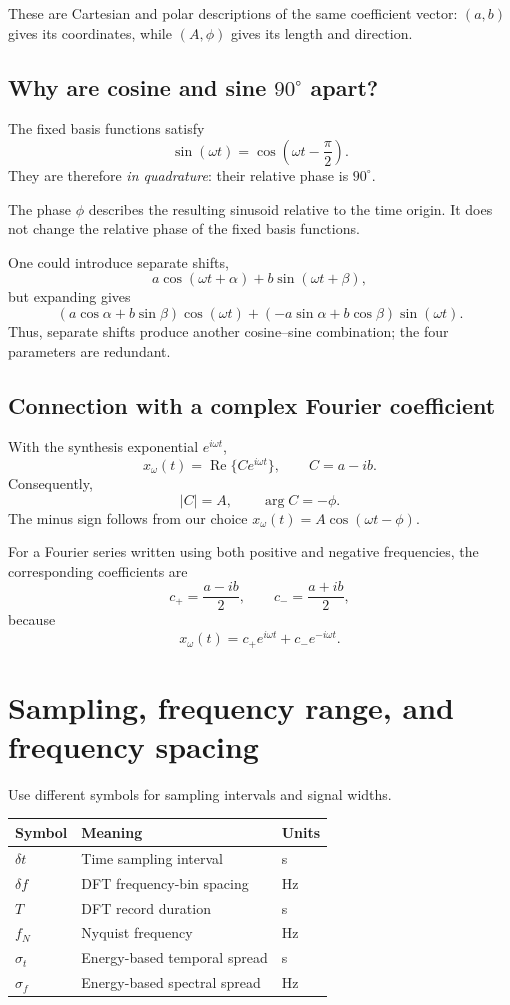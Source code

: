 \documentclass[11pt,letterpaper]{article}
\begin{document}
These are Cartesian and polar descriptions of the same coefficient
vector: $(a,b)$ gives its coordinates, while $(A,\phi)$ gives its
length and direction.

\subsection*{Why are cosine and sine $90^\circ$ apart?}

The fixed basis functions satisfy
\[
\sin(\omega t)=\cos\left(\omega t-\frac{\pi}{2}\right).
\]
They are therefore \emph{in quadrature}: their relative phase is
$90^\circ$.

The phase $\phi$ describes the resulting sinusoid relative to the
time origin. It does not change the relative phase of the fixed
basis functions.

One could introduce separate shifts,
\[
a\cos(\omega t+\alpha)+b\sin(\omega t+\beta),
\]
but expanding gives
\[
(a\cos\alpha+b\sin\beta)\cos(\omega t)
+(-a\sin\alpha+b\cos\beta)\sin(\omega t).
\]
Thus, separate shifts produce another cosine--sine combination;
the four parameters are redundant.

\subsection*{Connection with a complex Fourier coefficient}

With the synthesis exponential $e^{i\omega t}$,
\[
x_\omega(t)=\operatorname{Re}\{C e^{i\omega t}\},
\qquad C=a-ib.
\]
Consequently,
\[
|C|=A,\qquad \arg C=-\phi.
\]
The minus sign follows from our choice
$x_\omega(t)=A\cos(\omega t-\phi)$.

For a Fourier series written using both positive and negative
frequencies, the corresponding coefficients are
\[
c_+=\frac{a-ib}{2},\qquad c_-=\frac{a+ib}{2},
\]
because
\[
x_\omega(t)=c_+e^{i\omega t}+c_-e^{-i\omega t}.
\]

\section{Sampling, frequency range, and frequency spacing}

Use different symbols for sampling intervals and signal widths.

\begin{center}
\begin{tabular}{lll}
\toprule
Symbol & Meaning & Units\\
\midrule
$\delta t$ & Time sampling interval & s\\
$\delta f$ & DFT frequency-bin spacing & Hz\\
$T$ & DFT record duration & s\\
$f_N$ & Nyquist frequency & Hz\\
$\sigma_t$ & Energy-based temporal spread & s\\
$\sigma_f$ & Energy-based spectral spread & Hz\\
\bottomrule
\end{tabular}
\end{center}
\end{document}
